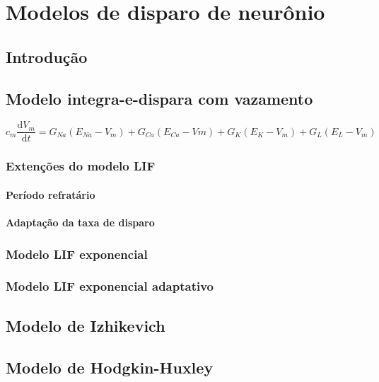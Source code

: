 \chapter{Modelos de disparo de neurônio}\label{cap:modelos}
\section{Introdução}\label{sec:modelos_intro}

\section{Modelo integra-e-dispara com vazamento}\label{sec:modelolif}

\begin{equation}
c_m\frac{\mathrm{d}V_m}{\mathrm{d}t}=G_{Na}(E_{Na}-V_m)+G_{Ca}(E_{Ca}-Vm)+G_K(E_K-V_m)+G_L(E_L-V_m)
\end{equation}

\subsection{Extenções do modelo LIF}

\subsubsection{Período refratário}

\subsubsection{Adaptação da taxa de disparo}

\subsection{Modelo LIF exponencial}

\subsection{Modelo LIF exponencial adaptativo}

\section{Modelo de Izhikevich}\label{sec:izhikevich}

\section{Modelo de Hodgkin-Huxley}\label{sec:modelohh}
